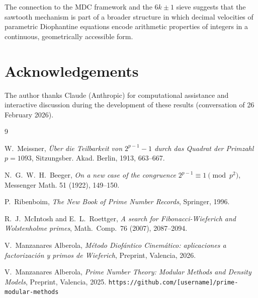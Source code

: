 \documentclass[12pt,a4paper]{article}
\theoremstyle{definition}
\theoremstyle{remark}
\begin{document}
The connection to the MDC framework and the $6k\pm 1$ sieve suggests
that the sawtooth mechanism is part of a broader structure in which
decimal velocities of parametric Diophantine equations encode
arithmetic properties of integers in a continuous, geometrically
accessible form.

\section*{Acknowledgements}

The author thanks Claude (Anthropic) for computational assistance and
interactive discussion during the development of these results
(conversation of 26 February 2026).

\begin{thebibliography}{9}

W.~Meissner,
\textit{\"Uber die Teilbarkeit von $2^{p-1}-1$ durch das Quadrat der
Primzahl $p=1093$},
Sitzungsber. Akad. Berlin, 1913, 663--667.

N.~G.~W.~H.~Beeger,
\textit{On a new case of the congruence $2^{p-1} \equiv 1\pmod{p^2}$},
Messenger Math. 51 (1922), 149--150.

P.~Ribenboim,
\textit{The New Book of Prime Number Records},
Springer, 1996.

R.~J.~McIntosh and E.~L.~Roettger,
\textit{A search for Fibonacci-Wieferich and Wolstenholme primes},
Math.\ Comp.\ 76 (2007), 2087--2094.

V.~Manzanares Alberola,
\textit{M\'etodo Diof\'antico Cinem\'atico: aplicaciones a
factorizaci\'on y primos de Wieferich},
Preprint, Valencia, 2026.

V.~Manzanares Alberola,
\textit{Prime Number Theory: Modular Methods and Density Models},
Preprint, Valencia, 2025.
\texttt{https://github.com/[username]/prime-modular-methods}

\end{thebibliography}
\end{document}
